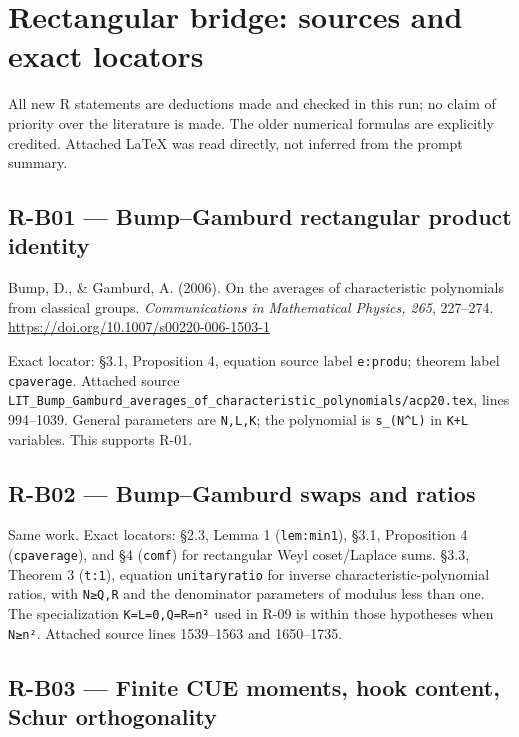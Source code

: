 \documentclass[11pt,a4paper]{article}
\theoremstyle{definition}\newtheorem{definition}{Definition}
\begin{document}
\section{Rectangular bridge: sources and exact
locators}\label{rectangular-bridge-sources-and-exact-locators}

All new R statements are deductions made and checked in this run; no
claim of priority over the literature is made. The older numerical
formulas are explicitly credited. Attached LaTeX was read directly, not
inferred from the prompt summary.

\subsection{R-B01 --- Bump--Gamburd rectangular product
identity}\label{r-b01--bumpgamburd-rectangular-product-identity}

Bump, D., \& Gamburd, A. (2006). On the averages of characteristic
polynomials from classical groups. \emph{Communications in Mathematical
Physics, 265}, 227--274. \url{https://doi.org/10.1007/s00220-006-1503-1}

Exact locator: §3.1, Proposition 4, equation source label
\nolinkurl{e:produ}; theorem label \nolinkurl{cpaverage}. Attached source
\nolinkurl{LIT_Bump_Gamburd_averages_of_characteristic_polynomials/acp20.tex},
lines 994--1039. General parameters are \nolinkurl{N,L,K}; the polynomial
is \texttt{s\_(N\^{}L)} in \nolinkurl{K+L} variables. This supports R-01.

\subsection{R-B02 --- Bump--Gamburd swaps and
ratios}\label{r-b02--bumpgamburd-swaps-and-ratios}

Same work. Exact locators: §2.3, Lemma 1 (\nolinkurl{lem:min1}), §3.1,
Proposition 4 (\nolinkurl{cpaverage}), and §4 (\nolinkurl{comf}) for
rectangular Weyl coset/Laplace sums. §3.3, Theorem 3 (\nolinkurl{t:1}),
equation \nolinkurl{unitaryratio} for inverse characteristic-polynomial
ratios, with \nolinkurl{N≥Q,R} and the denominator parameters of modulus
less than one. The specialization \nolinkurl{K=L=0,Q=R=n²} used in R-09 is
within those hypotheses when \nolinkurl{N≥n²}. Attached source lines
1539--1563 and 1650--1735.

\subsection{R-B03 --- Finite CUE moments, hook content, Schur
orthogonality}\label{r-b03--finite-cue-moments-hook-content-schur-orthogonality}
\end{document}
